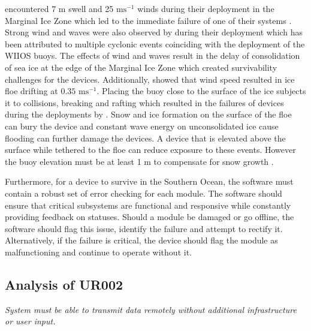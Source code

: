 \textcite{kohout2015device} encountered 7 m swell and 25 $\text{ms}^{-1}$ winds during their deployment in the Marginal Ice Zone which led to the immediate failure of one of their systems \cite{kohout2015device}. Strong wind and waves were also observed by \textcite{vichi2019effects,alberello2019drift} during their deployment which has been attributed to multiple cyclonic events coinciding with the deployment of the WIIOS buoys. The effects of wind and waves result in the delay of consolidation of sea ice at the edge of the Marginal Ice Zone which created survivability challenges for the devices. Additionally, \textcite{albarello2020drift} showed that wind speed resulted in ice floe drifting at $0.35$ $\text{ms}^{-1}$. Placing the buoy close to the surface of the ice subjects it to collisions, breaking and rafting which resulted in the failures of devices during the deployments by \textcite{doble2017robust,rabault2019open}. Snow and ice formation on the surface of the floe can bury the device \cite{doble2017robust} and constant wave energy on unconsolidated ice cause flooding can further damage the devices. A device that is elevated above the surface while tethered to the floe can reduce exposure to these events. However the buoy elevation must be at least 1 m to compensate for snow growth \cite{barber2005microwave}. \par

Furthermore, for a device to survive in the Southern Ocean, the software must contain a robust set of error checking for each module. The software should ensure that critical subsystems are functional and responsive while constantly providing feedback on statuses. Should a module be damaged or go offline, the software should flag this issue, identify the failure and attempt to rectify it. Alternatively, if the failure is critical, the device should flag the module as malfunctioning and continue to operate without it.

\subsection{Analysis of UR002}
\textit{System must be able to transmit data remotely without additional infrastructure or user input.}

